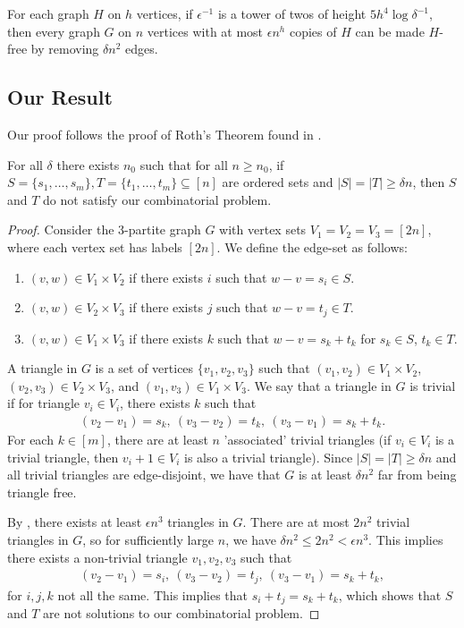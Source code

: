 \begin{lemma}
	For each graph $H$ on $h$ vertices, if $\epsilon^{-1}$ is a tower of twos of height $5h^4\log \delta^{-1}$, then every graph $G$ on $n$ vertices with at most $\epsilon n^h$ copies of $H$ can be made $H$-free by removing $\delta n^2$ edges.
\end{lemma}

\subsection{Our Result}
Our proof follows the proof of Roth's Theorem found in \cite{Lee15}.

\begin{theorem}
	For all $\delta$ there exists $n_0$ such that for all $n \geq n_0$, if $S=\{s_1,\dotsc,s_m\},T=\{t_1,\dotsc,t_m\} \subseteq [n]$ are ordered sets and $|S| = |T| \geq \delta n$, then $S$ and $T$ do not satisfy our combinatorial problem.
\end{theorem}
\begin{proof}
	Consider the 3-partite graph $G$ with vertex sets $V_1 = V_2 = V_3 = [2n]$, where each vertex set has labels $[2n]$. We define the edge-set as follows:
	\begin{enumerate}
		\item $(v,w) \in V_1 \times V_2$ if there exists $i$ such that $w-v = s_i \in S$.
		\item $(v,w) \in V_2 \times V_3$ if there exists $j$ such that $w-v = t_j \in T$.
		\item $(v,w) \in V_1 \times V_3$ if there exists $k$ such that $w-v = s_k + t_k$ for $s_k \in S$, $t_k \in T$.
	\end{enumerate}
	A triangle in $G$ is a set of vertices $\{v_1, v_2, v_3\}$ such that $(v_1,v_2) \in V_1 \times V_2$, $(v_2,v_3) \in V_2\times V_3$, and $(v_1,v_3) \in V_1\times V_3$. We say that a triangle in $G$ is trivial if for triangle $v_i \in V_i$, there exists $k$ such that
	\begin{align*}
		(v_2 - v_1) = s_k,\ (v_3-v_2) = t_k,\ (v_3-v_1) = s_k+t_k.
	\end{align*}
	For each $k \in [m]$, there are at least $n$ 'associated' trivial triangles (if $v_i \in V_i$ is a trivial triangle, then $v_i + 1 \in V_i$ is also a trivial triangle). Since $|S| = |T| \geq \delta n$ and all trivial triangles are edge-disjoint, we have that $G$ is at least $\delta n^2$ far from being triangle free.
	
	By , there exists at least $\epsilon n^3$ triangles in $G$. There are at most $2n^2$ trivial triangles in $G$, so for sufficiently large $n$, we have $\delta n^2 \leq 2n^2 < \epsilon n^3$. This implies there exists a non-trivial triangle $v_1, v_2, v_3$ such that
	\begin{align*}
		(v_2 - v_1) = s_i,\ (v_3 - v_2) = t_j,\ (v_3 - v_1) = s_k + t_k,
	\end{align*}
	for $i,j,k$ not all the same. This implies that $s_i + t_j = s_k + t_k$, which shows that $S$ and $T$ are not solutions to our combinatorial problem.
\end{proof}

